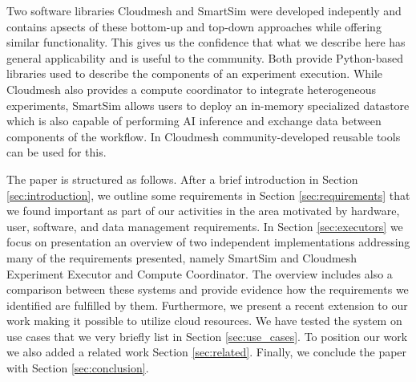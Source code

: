 Two software libraries Cloudmesh and SmartSim were developed indepently and contains apsects of these bottom-up and top-down approaches while offering similar functionality. This gives us the confidence that what we describe here has general applicability and is useful to the community. Both provide Python-based libraries used to describe the components of an experiment execution. While Cloudmesh also provides a compute coordinator to integrate heterogeneous experiments, SmartSim allows users to deploy an in-memory specialized datastore which is also capable of performing AI inference and exchange data between components of the workflow. In Cloudmesh \citep{cloudmesh-ee} community-developed reusable tools can be used for this.

The paper is structured as follows. After a brief introduction in Section \ref{sec:introduction}, we outline some requirements in Section \ref{sec:requirements} that we found important as part of our activities in the area motivated by hardware, user, software, and data management requirements. In  Section \ref{sec:executors} we focus on presentation an overview of two independent implementations addressing many of the requirements presented, namely SmartSim and Cloudmesh Experiment Executor and Compute Coordinator. The overview includes also a comparison between these systems and provide evidence how the requirements we identified are fulfilled by them. Furthermore, we present a recent extension to our work making it possible to utilize cloud resources.
We have tested the system on use cases that we very briefly list in Section \ref{sec:use_cases}.
To position our work we also added a related work Section \ref{sec:related}.
 Finally, we conclude the paper with Section \ref{sec:conclusion}.

\begin{comment}
In an appendix, we also summarize relevant research done by the coauthors of this paper that addresses many issues related to workflows and are directly related to activities the authors have been involved with (Section \ref{sec:related}).
\end{comment}